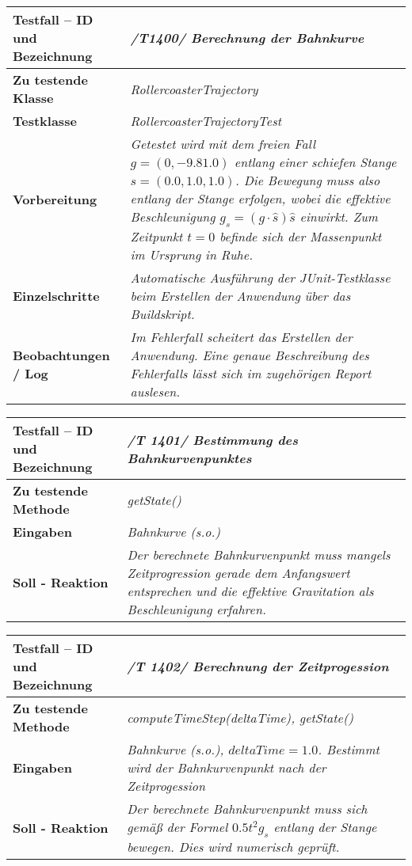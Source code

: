 \begin{longtable}{|p{7cm}|p{10cm}|}
\hline
\textbf{Testfall -- ID und Bezeichnung} &  \textit{/T1400/ Berechnung der Bahnkurve} \\
\hline
\textbf{Zu testende Klasse} &  \textit{RollercoasterTrajectory} \\
\hline
\textbf{Testklasse} &  \textit{RollercoasterTrajectoryTest} \\
\hline
\textbf{Vorbereitung} & \textit{Getestet wird mit dem freien Fall $g = (0, -9.81. 0) $ 
entlang einer schiefen Stange $s = (0.0, 1.0, 1.0)$. Die Bewegung muss also entlang 
der Stange erfolgen, wobei die effektive Beschleunigung $g_s = (g \cdot \hat s) \hat s$ einwirkt.
Zum Zeitpunkt $t = 0$ befinde sich der Massenpunkt im Ursprung in Ruhe.} \\
\hline
\textbf{Einzelschritte} &  \textit{Automatische Ausführung der JUnit-Testklasse beim Erstellen
der Anwendung über das Buildskript.} \\
\hline
\textbf{Beobachtungen / Log} &  \textit{Im Fehlerfall scheitert das Erstellen der Anwendung.
Eine genaue Beschreibung des Fehlerfalls lässt sich im zugehörigen Report auslesen.} \\
\hline
\end{longtable}


\begin{longtable}{|p{7cm}|p{10cm}|}
\hline
\textbf{Testfall -- ID und Bezeichnung} & \textit{ /T 1401/ Bestimmung des Bahnkurvenpunktes} \\
\hline
\textbf{Zu testende Methode} &  \textit{getState()} \\
\hline
\textbf{Eingaben} & \textit{Bahnkurve (s.o.)}\\
\hline
\textbf{Soll - Reaktion} & \textit{Der berechnete Bahnkurvenpunkt muss mangels
Zeitprogression gerade dem Anfangswert entsprechen und die effektive Gravitation
als Beschleunigung erfahren. } \\
\hline
\end{longtable}

\begin{longtable}{|p{7cm}|p{10cm}|}
\hline
\textbf{Testfall -- ID und Bezeichnung} & \textit{ /T 1402/ Berechnung der Zeitprogession} \\
\hline
\textbf{Zu testende Methode} &  \textit{computeTimeStep(deltaTime), getState()} \\
\hline
\textbf{Eingaben} & \textit{Bahnkurve (s.o.), $deltaTime = 1.0$. Bestimmt wird der
Bahnkurvenpunkt nach der Zeitprogession}\\
\hline
\textbf{Soll - Reaktion} & \textit{
Der berechnete Bahnkurvenpunkt muss sich gemäß der Formel $0.5 t^2 g_s$ entlang
der Stange bewegen. Dies wird numerisch geprüft.} \\
\hline
\end{longtable}

